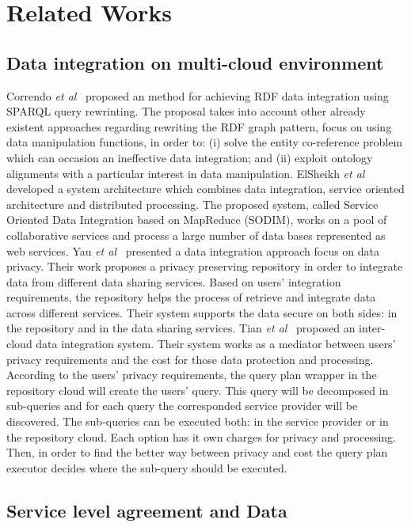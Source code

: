 \section{Related Works}\label{sec:rw}

\subsection{Data integration on multi-cloud environment}
Correndo \textit{et al}~\cite{075} proposed an method for achieving RDF data integration
using SPARQL query rewrinting. 
The proposal takes into account other already existent approaches regarding rewriting 
the RDF graph pattern, focus on using data manipulation functions, in order to: (i) solve 
the entity co-reference problem which can occasion an ineffective data integration; 
and (ii) exploit ontology alignments with a particular interest in data manipulation. 
ElSheikh \textit{et al}~\cite{078} developed a system architecture which combines data integration,
service oriented architecture and distributed processing. The proposed system, called Service 
Oriented Data Integration based on MapReduce (SODIM), works on a pool of collaborative services and 
process a large number of data bases represented as web services. 
Yau \textit{et al}~\cite{YauY08} presented a data integration approach focus on data privacy.
Their work proposes a privacy preserving repository in order to integrate data from
different data sharing services. 
Based on users' integration requirements, the repository helps the process of retrieve and integrate
data across different services.
Their system supports the data secure on both sides: in the repository and in the data sharing services. 
Tian \textit{et al}~\cite{096} proposed an inter-cloud data integration system. 
Their system works as a mediator between users' privacy requirements and the cost for those data 
protection and processing.
According to the users' privacy requirements, the query plan wrapper in the repository cloud will
create the users' query. This query will be decomposed in sub-queries and for each query the 
corresponded service provider will be discovered. 
The sub-queries can be executed both: in the service provider or in the repository cloud.
Each option has it own charges for privacy and processing. 
Then, in order to find the better way between privacy and cost the query plan executor decides where 
the sub-query should be executed.

\subsection{Service level agreement and Data}
